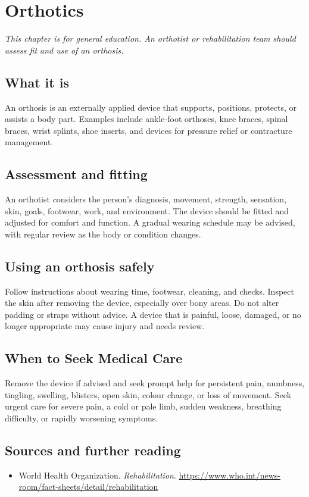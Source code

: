 \chapter{Orthotics}

\medskip
\noindent\textit{This chapter is for general education. An orthotist or rehabilitation team should assess fit and use of an orthosis.}

\section*{What it is}
An orthosis is an externally applied device that supports, positions, protects, or assists a body part. Examples include ankle-foot orthoses, knee braces, spinal braces, wrist splints, shoe inserts, and devices for pressure relief or contracture management.

\section*{Assessment and fitting}
An orthotist considers the person’s diagnosis, movement, strength, sensation, skin, goals, footwear, work, and environment. The device should be fitted and adjusted for comfort and function. A gradual wearing schedule may be advised, with regular review as the body or condition changes.

\section*{Using an orthosis safely}
Follow instructions about wearing time, footwear, cleaning, and checks. Inspect the skin after removing the device, especially over bony areas. Do not alter padding or straps without advice. A device that is painful, loose, damaged, or no longer appropriate may cause injury and needs review.

\section*{When to Seek Medical Care}
Remove the device if advised and seek prompt help for persistent pain, numbness, tingling, swelling, blisters, open skin, colour change, or loss of movement. Seek urgent care for severe pain, a cold or pale limb, sudden weakness, breathing difficulty, or rapidly worsening symptoms.

\section*{Sources and further reading}
\begin{itemize}
\item World Health Organization. \textit{Rehabilitation}. \url{https://www.who.int/news-room/fact-sheets/detail/rehabilitation}
\end{itemize}
